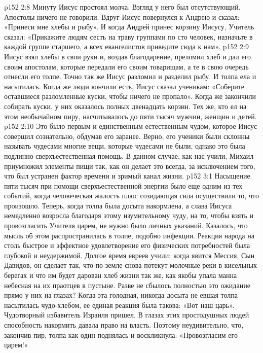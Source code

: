 \vs p152 2:8 Минуту Иисус простоял молча. Взгляд у него был отсутствующий. Апостолы ничего не говорили. Вдруг Иисус повернулся к Андрею и сказал: «Принеси мне хлебы и рыбу». И когда Андрей принес корзину Иисусу, Учитель сказал: «Прикажите людям сесть на траву группами по сто человек, назначьте в каждой группе старшего, а всех евангелистов приведите сюда к нам».
\vs p152 2:9 Иисус взял хлебы в свои руки и, воздав благодарение, преломил хлеб и дал его своим апостолам, которые передали его своим товарищам, а те в свою очередь отнесли его толпе. Точно так же Иисус разломил и разделил рыбу. И толпа ела и насытилась. Когда же люди кончили есть, Иисус сказал ученикам: «Соберите оставшиеся разломленные куски, чтобы ничего не пропало». Когда же закончили собирать куски, у них оказалось полных двенадцать корзин. Тех же, кто ел на этом необычайном пиру, насчитывалось до пяти тысяч мужчин, женщин и детей.
\vs p152 2:10 \pc Это было первым и единственным естественным чудом, которое Иисус совершил сознательно, обдумав его заранее. Верно, его ученики были склонны называть чудесами многие вещи, которые чудесами не были, однако это была подлинно сверхъестественная помощь. В данном случае, как нас учили, Михаил приумножил элементы пищи так, как он делает это всегда, за исключением того, что был устранен фактор времени и зримый канал жизни.
\vs p152 3:1 Насыщение пяти тысяч при помощи сверхъестественной энергии было еще одним из тех событий, когда человеческая жалость плюс созидающая сила осуществили то, что произошло. Теперь, когда толпа была досыта накормлена, а слава Иисуса немедленно возросла благодаря этому изумительному чуду, на то, чтобы взять и провозгласить Учителя царем, не нужно было личных указаний. Казалось, что мысль об этом распространилась в толпе, подобно инфекции. Реакция народа на столь быстрое и эффектное удовлетворение его физических потребностей была глубокой и неудержимой. Долгое время евреев учили: когда явится Мессия, Сын Давидов, он сделает так, что по земле снова потекут молочные реки в кисельных берегах и что им будет дарован хлеб жизни так же, как якобы упала манна небесная на их праотцев в пустыне. Разве не сбылось полностью это ожидание прямо у них на глазах? Когда эта голодная, никогда досыта не евшая толпа насытилась чудо\hyp{}хлебом, ее единая реакция была такова: «Вот наш царь». Чудотворный избавитель Израиля пришел. В глазах этих простодушных людей способность накормить давала право на власть. Поэтому неудивительно, что, закончив пир, толпа как один поднялась и воскликнула: «Провозгласим его царем!»
